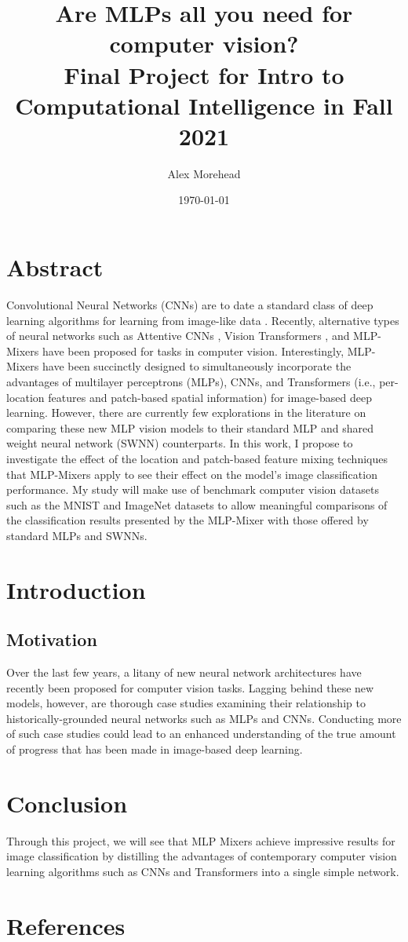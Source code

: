 \documentclass[11pt]{article}
\author{Alex Morehead}
\date{\today}
\title{Are MLPs all you need for computer vision?\\\medskip
\large Final Project for Intro to Computational Intelligence in Fall 2021}
\begin{document}
\maketitle
\tableofcontents

\newpage

\section{Abstract}
\label{sec:orgea26f93}
Convolutional Neural Networks (CNNs) are to date a standard class of deep
learning algorithms for learning from image-like data
\cite{albawi2017understanding}. Recently, alternative types of neural networks
such as Attentive CNNs \cite{neumann2017attentive}, Vision Transformers
\cite{han2020survey}, and MLP-Mixers \cite{tolstikhin2021mlp} have been proposed for
tasks in computer vision. Interestingly, MLP-Mixers have been succinctly
designed to simultaneously incorporate the advantages of multilayer perceptrons
(MLPs), CNNs, and Transformers (i.e., per-location features and patch-based
spatial information) for image-based deep learning. However, there are currently
few explorations in the literature on comparing these new MLP vision models to
their standard MLP and shared weight neural network (SWNN) counterparts. In this
work, I propose to investigate the effect of the location and patch-based
feature mixing techniques that MLP-Mixers apply to see their effect on the
model's image classification performance. My study will make use of benchmark
computer vision datasets such as the MNIST and ImageNet datasets to allow
meaningful comparisons of the classification results presented by the MLP-Mixer
with those offered by standard MLPs and SWNNs.
\section{Introduction}
\label{sec:org8d17cdb}
\subsection{Motivation}
\label{sec:orgf95f681}
Over the last few years, a litany of new neural network architectures have
recently been proposed for computer vision tasks. Lagging behind these new
models, however, are thorough case studies examining their relationship to
historically-grounded neural networks such as MLPs and CNNs. Conducting more of
such case studies could lead to an enhanced understanding of the true amount of
progress that has been made in image-based deep learning.

\section{Conclusion}
\label{sec:orgc3cf4c1}
Through this project, we will see that MLP Mixers achieve impressive results for
image classification by distilling the advantages of contemporary computer
vision learning algorithms such as CNNs and Transformers into a single simple
network.
\newpage
\section{References}
\label{sec:orgfb6d2c5}


\end{document}
